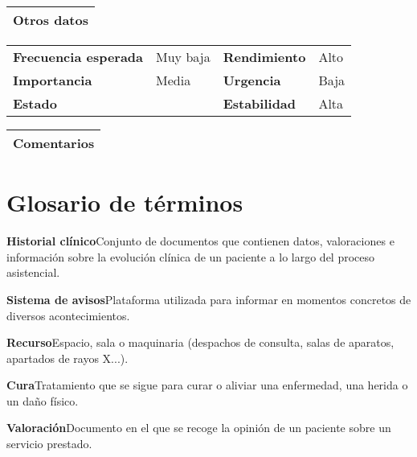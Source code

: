 \documentclass[11pt,a4paper]{article}
\newcommand{\term}[2]{\textbf{#1}\quad#2}
\begin{document}
\begin{table}[H]
	\begin{tabularx}{\textwidth}{X}
		\textbf{Otros datos}\\ \hline
	\end{tabularx}
	\begin{tabularx}{\textwidth}{lXlX}
		\textbf{Frecuencia esperada} & Muy baja & \textbf{Rendimiento} & Alto\\
		\textbf{Importancia} & Media & \textbf{Urgencia} & Baja\\
		\textbf{Estado} &  & \textbf{Estabilidad} & Alta \\
	\end{tabularx}
	
	\begin{tabularx}{\textwidth}{X}
		\textbf{Comentarios}\\ \hline
	\end{tabularx}
\end{table}

\newpage


\section{Glosario de términos}
\term{Historial clínico} Conjunto de documentos que contienen datos, valoraciones e información sobre la evolución clínica de un paciente a lo largo del proceso asistencial.

\term{Sistema de avisos} Plataforma utilizada para informar en momentos concretos de diversos acontecimientos.

\term{Recurso} Espacio, sala o maquinaria (despachos de consulta, salas de aparatos, apartados de rayos X...).

\term{Cura} Tratamiento que se sigue para curar o aliviar una enfermedad, una herida o un daño físico.

\term{Valoración} Documento en el que se recoge la opinión de un paciente sobre un servicio prestado.



\end{document}
